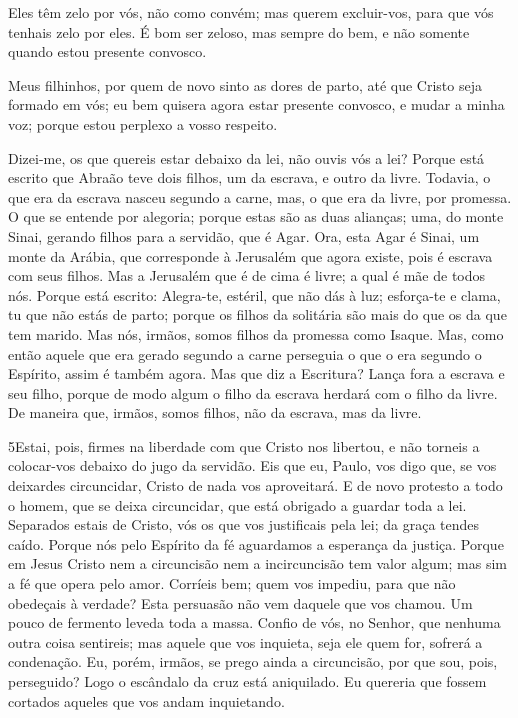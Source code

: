 Eles têm zelo por vós, não como convém; mas querem excluir-vos,
para que vós tenhais zelo por eles. É bom ser zeloso, mas
sempre do bem, e não somente quando estou presente convosco.

Meus filhinhos, por quem de novo sinto as dores de parto, até que
Cristo seja formado em vós; eu bem quisera agora estar
presente convosco, e mudar a minha voz; porque estou perplexo a
vosso respeito.

Dizei-me, os que quereis estar debaixo da lei, não ouvis vós a
lei? Porque está escrito que Abraão teve dois filhos, um da
escrava, e outro da livre. Todavia, o que era da escrava
nasceu segundo a carne, mas, o que era da livre, por promessa.
O que se  entende por alegoria; porque estas são as duas
alianças; uma, do monte Sinai, gerando filhos para a servidão, que é
Agar. Ora, esta Agar é Sinai, um monte da Arábia, que
corresponde à Jerusalém que agora existe, pois é escrava com seus
filhos. Mas a Jerusalém que é de cima é livre; a qual é mãe
de todos nós. Porque está escrito: Alegra-te, estéril, que
não dás à luz; esforça-te e clama, tu que não estás de parto; porque
os filhos da solitária são mais do que os da que tem marido.
Mas nós, irmãos, somos filhos da promessa como Isaque.
Mas, como então aquele que era gerado segundo a carne
perseguia o que o era segundo o Espírito, assim é também agora.
Mas que diz a Escritura? Lança fora a escrava e seu filho,
porque de modo algum o filho da escrava herdará com o filho da
livre. De maneira que, irmãos, somos filhos, não da escrava,
mas da livre.

\medskip

\lettrine{5} Estai, pois, firmes na liberdade com que Cristo
nos libertou, e não torneis a colocar-vos debaixo do jugo da
servidão. Eis que eu, Paulo, vos digo que, se vos deixardes
circuncidar, Cristo de nada vos aproveitará. E de novo protesto
a todo o homem, que se deixa circuncidar, que está obrigado a
guardar toda a lei. Separados estais de Cristo, vós os que vos
justificais pela lei; da graça tendes caído. Porque nós pelo
Espírito da fé aguardamos a esperança da justiça. Porque em
Jesus Cristo nem a circuncisão nem a incircuncisão tem valor algum;
mas sim a fé que opera pelo amor. Corríeis bem; quem vos
impediu, para que não obedeçais à verdade? Esta persuasão não
vem daquele que vos chamou. Um pouco de fermento leveda toda a
massa. Confio de vós, no Senhor, que nenhuma outra coisa
sentireis; mas aquele que vos inquieta, seja ele quem for, sofrerá a
condenação. Eu, porém, irmãos, se prego ainda a circuncisão,
por que sou, pois, perseguido? Logo o escândalo da cruz está
aniquilado. Eu quereria que fossem cortados aqueles que vos
andam inquietando.

